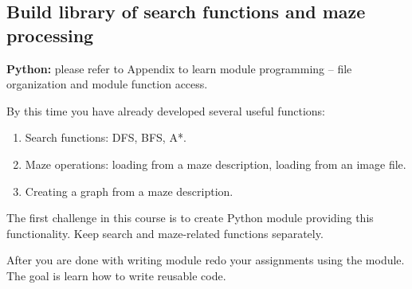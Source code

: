 \subsection{Build library of search functions and maze processing}

\begin{tcolorbox}
\textbf{Python:} please refer to Appendix to learn
module programming -- file organization and module function access.
\end{tcolorbox}

By this time you have already developed several useful functions:
\begin{enumerate}
\item Search functions: DFS, BFS, A*.
\item Maze operations: loading from a maze description, loading from an image file.
\item Creating a graph from a maze description.
\end{enumerate}

The first challenge in this course is to create Python module providing
this functionality. Keep search and maze-related functions separately.

After you are done with writing module redo your assignments using
the module. The goal is learn how to write reusable code.






